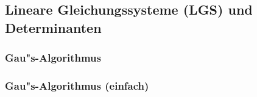 
%


%
%
%

\subsection{Lineare Gleichungssysteme (LGS) und Determinanten}

\subsubsection{Gau"s-Algorithmus}



\subsubsection{Gau"s-Algorithmus (einfach)}


